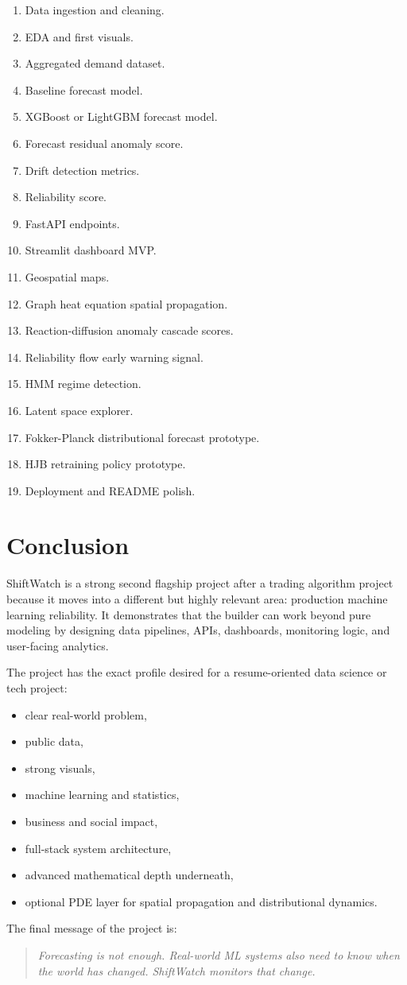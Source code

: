 \documentclass[11pt]{article}
\begin{document}
\begin{enumerate}
    \item Data ingestion and cleaning.
    \item EDA and first visuals.
    \item Aggregated demand dataset.
    \item Baseline forecast model.
    \item XGBoost or LightGBM forecast model.
    \item Forecast residual anomaly score.
    \item Drift detection metrics.
    \item Reliability score.
    \item FastAPI endpoints.
    \item Streamlit dashboard MVP.
    \item Geospatial maps.
    \item Graph heat equation spatial propagation.
    \item Reaction-diffusion anomaly cascade scores.
    \item Reliability flow early warning signal.
    \item HMM regime detection.
    \item Latent space explorer.
    \item Fokker-Planck distributional forecast prototype.
    \item HJB retraining policy prototype.
    \item Deployment and README polish.
\end{enumerate}

\section{Conclusion}

ShiftWatch is a strong second flagship project after a trading algorithm project because it moves into a different but highly relevant area: production machine learning reliability. It demonstrates that the builder can work beyond pure modeling by designing data pipelines, APIs, dashboards, monitoring logic, and user-facing analytics.

The project has the exact profile desired for a resume-oriented data science or tech project:

\begin{itemize}
    \item clear real-world problem,
    \item public data,
    \item strong visuals,
    \item machine learning and statistics,
    \item business and social impact,
    \item full-stack system architecture,
    \item advanced mathematical depth underneath,
    \item optional PDE layer for spatial propagation and distributional dynamics.
\end{itemize}

The final message of the project is:

\begin{quote}
    \textit{Forecasting is not enough. Real-world ML systems also need to know when the world has changed. ShiftWatch monitors that change.}
\end{quote}
\end{document}
